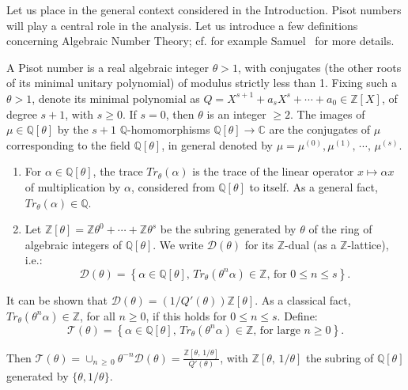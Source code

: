 \documentclass[AHL,Unicode,longabstracts,published]{cedram}
\newcommand{\Cbb}{\mathbb C}
\newcommand{\Qbb}{\mathbb Q}
\newcommand{\Zbb}{\mathbb Z}
\newcommand{\Dcl}{\mathcal{D}}
\newcommand{\Tcl}{\mathcal{T}}
\newcommand*{\romanenumi}{\renewcommand*{\theenumi}{\roman{enumi}}}
\begin{document}
Let us place in the general context considered in the Introduction. Pisot numbers will play a central role in the analysis. Let us introduce a few definitions concerning Algebraic Number Theory; cf. for example Samuel~\cite{samuel} for more details.


\begin{defi}
A Pisot number is a real algebraic integer $\theta>1$, with conjugates (the other roots of its minimal unitary polynomial) of modulus strictly less than 1. Fixing such a $\theta>1$, denote its minimal polynomial as $Q=X^{s+1}+a_sX^s+\cdots+a_0\in\Zbb[X]$, of degree $s+1$, with $s\geq0$. If $s=0$, then $\theta$ is an integer $\geq2$. The images of $\mu\in\Qbb[\theta]$ by the $s+1$ $\Qbb$-homomorphisms $\Qbb[\theta]\rightarrow\Cbb$ are the conjugates of $\mu$ corresponding to the field $\Qbb[\theta]$, in general denoted by $\mu=\mu^{(0)},\mu^{(1)},\,\cdots,\,\mu^{(s)}$.

\begin{enumerate}\romanenumi
\item \label{defi2.1.1}For $\alpha\in\Qbb[\theta]$, the trace $Tr_{\theta}(\alpha)$ is the trace of the linear operator $x\longmapsto \alpha x$ of multiplication by $\alpha$, considered from $\Qbb[\theta]$ to itself. As a general fact, $Tr_{\theta}(\alpha)\in\Qbb$.


\item \label{defi2.1.2}Let $\Zbb[\theta]=\Zbb\theta^0+\cdots+\Zbb\theta^s$ be the subring generated by $\theta$ of the ring of algebraic integers of $\Qbb[\theta]$. We write ${\Dcl}(\theta)$ for its $\Zbb$-dual (as a $\Zbb$-lattice), i.e.:
\[
\Dcl(\theta)=\left\{\alpha\in \Qbb[\theta],\,Tr_{\theta}(\theta^n\alpha)\in\Zbb\text{, for }0\leq n\leq s\right\}.
\]
\end{enumerate}

It can be shown that ${\Dcl}(\theta)=(1/Q'(\theta))\Zbb[\theta]$. As a classical fact, $Tr_{\theta}(\theta^n\alpha)\in\Zbb$, for all $n\geq0$, if this holds for $0\leq n\leq s$. Define:
\[
\Tcl(\theta)=\left\{\alpha\in\Qbb[\theta],\,Tr_{\theta}(\theta^n\alpha)\in\Zbb\text{, for large }n\geq0\right\}.
\]


Then $\Tcl(\theta)=\cup_{n\,\geq\,0}\theta^{-n}{\Dcl}(\theta)=\tfrac{\Zbb[\theta,\,1/\theta]}{Q'(\theta)}$, with $\Zbb[\theta,\,1/\theta]$ the subring of $\Qbb[\theta]$ generated by $\{\theta,1/\theta\}$.
\end{defi}
\end{document}
